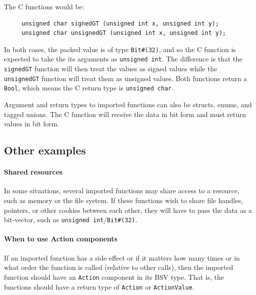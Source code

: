 \documentclass[twoside,letterpaper]{article}
\newcommand{\te}[1]{\texttt{#1}}
\begin{document}
The C functions would be:
\begin{verbatim}
     unsigned char signedGT (unsigned int x, unsigned int y);
     unsigned char unsignedGT (unsigned int x, unsigned int y);
\end{verbatim}

In both cases, the packed value is of type \te{Bit\#(32)}, and so the
C  function is expected to take the its arguments as \te{unsigned
int}.  The difference is that the \te{signedGT} function will then
treat the  values as signed  values while the \te{unsignedGT} function
will treat them as unsigned values.  Both functions return a
\te{Bool}, which means the C return type is \te{unsigned char}.




Argument and return types to imported functions can also be structs,
enums, and tagged unions. The C function will receive the data in bit
form and must return values in bit form.

\subsection{Other examples}

\paragraph{Shared resources} 
In some situations, several imported functions may share access to a
resource,  such as memory or the file system. If these functions wish
to share  file handles, pointers, or other cookies between each other,
they  will have to pass the data as a bit-vector, such as \te{unsigned
int}/\te{Bit\#(32)}.

\paragraph{When to use Action components} 
If an imported
function has  a side effect or if it matters how many times or in what
order  the function is called (relative to other calls), then the
imported  function should have an \te{Action} component in its BSV type.  That
is, the functions should have a return type of \te{Action} or \te{ActionValue}. 
\end{document}
